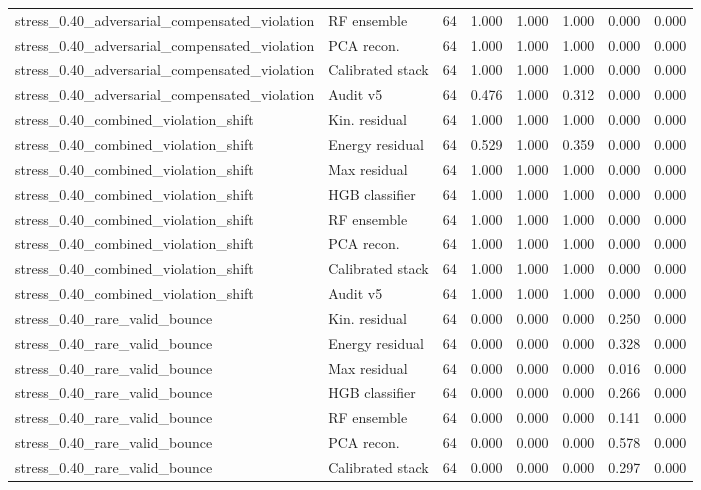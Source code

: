 {\begin{longtable}{llrrrrrr}
stress\_0.40\_adversarial\_compensated\_violation & RF ensemble & 64 & 1.000 & 1.000 & 1.000 & 0.000 & 0.000 \\
stress\_0.40\_adversarial\_compensated\_violation & PCA recon. & 64 & 1.000 & 1.000 & 1.000 & 0.000 & 0.000 \\
stress\_0.40\_adversarial\_compensated\_violation & Calibrated stack & 64 & 1.000 & 1.000 & 1.000 & 0.000 & 0.000 \\
stress\_0.40\_adversarial\_compensated\_violation & Audit v5 & 64 & 0.476 & 1.000 & 0.312 & 0.000 & 0.000 \\
stress\_0.40\_combined\_violation\_shift & Kin. residual & 64 & 1.000 & 1.000 & 1.000 & 0.000 & 0.000 \\
stress\_0.40\_combined\_violation\_shift & Energy residual & 64 & 0.529 & 1.000 & 0.359 & 0.000 & 0.000 \\
stress\_0.40\_combined\_violation\_shift & Max residual & 64 & 1.000 & 1.000 & 1.000 & 0.000 & 0.000 \\
stress\_0.40\_combined\_violation\_shift & HGB classifier & 64 & 1.000 & 1.000 & 1.000 & 0.000 & 0.000 \\
stress\_0.40\_combined\_violation\_shift & RF ensemble & 64 & 1.000 & 1.000 & 1.000 & 0.000 & 0.000 \\
stress\_0.40\_combined\_violation\_shift & PCA recon. & 64 & 1.000 & 1.000 & 1.000 & 0.000 & 0.000 \\
stress\_0.40\_combined\_violation\_shift & Calibrated stack & 64 & 1.000 & 1.000 & 1.000 & 0.000 & 0.000 \\
stress\_0.40\_combined\_violation\_shift & Audit v5 & 64 & 1.000 & 1.000 & 1.000 & 0.000 & 0.000 \\
stress\_0.40\_rare\_valid\_bounce & Kin. residual & 64 & 0.000 & 0.000 & 0.000 & 0.250 & 0.000 \\
stress\_0.40\_rare\_valid\_bounce & Energy residual & 64 & 0.000 & 0.000 & 0.000 & 0.328 & 0.000 \\
stress\_0.40\_rare\_valid\_bounce & Max residual & 64 & 0.000 & 0.000 & 0.000 & 0.016 & 0.000 \\
stress\_0.40\_rare\_valid\_bounce & HGB classifier & 64 & 0.000 & 0.000 & 0.000 & 0.266 & 0.000 \\
stress\_0.40\_rare\_valid\_bounce & RF ensemble & 64 & 0.000 & 0.000 & 0.000 & 0.141 & 0.000 \\
stress\_0.40\_rare\_valid\_bounce & PCA recon. & 64 & 0.000 & 0.000 & 0.000 & 0.578 & 0.000 \\
stress\_0.40\_rare\_valid\_bounce & Calibrated stack & 64 & 0.000 & 0.000 & 0.000 & 0.297 & 0.000 \\

\end{longtable}}
